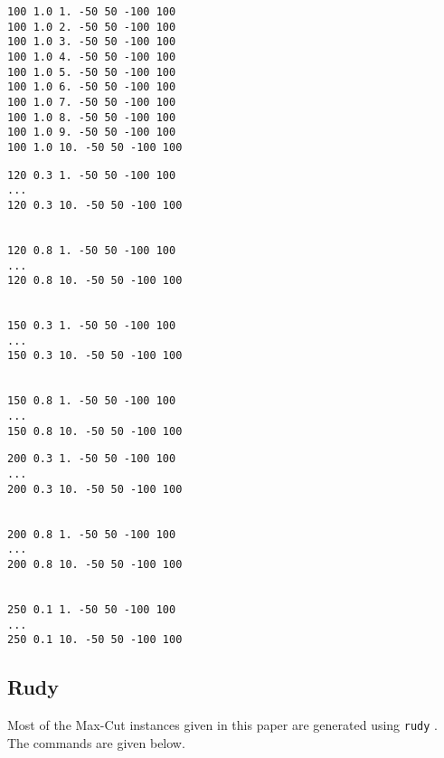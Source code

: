 \documentclass[a4paper, 12pt]{article}
\begin{document}
\begin{minipage}[t]{4cm}
\begin{tiny}
\begin{verbatim}   
100 1.0 1. -50 50 -100 100
100 1.0 2. -50 50 -100 100
100 1.0 3. -50 50 -100 100
100 1.0 4. -50 50 -100 100
100 1.0 5. -50 50 -100 100
100 1.0 6. -50 50 -100 100
100 1.0 7. -50 50 -100 100
100 1.0 8. -50 50 -100 100
100 1.0 9. -50 50 -100 100
100 1.0 10. -50 50 -100 100
\end{verbatim}
\end{tiny}
\end{minipage}
\hfill
\begin{minipage}[t]{4cm}
\begin{tiny}
\begin{verbatim}   
120 0.3 1. -50 50 -100 100
...
120 0.3 10. -50 50 -100 100


120 0.8 1. -50 50 -100 100
...
120 0.8 10. -50 50 -100 100


150 0.3 1. -50 50 -100 100
...
150 0.3 10. -50 50 -100 100


150 0.8 1. -50 50 -100 100
...
150 0.8 10. -50 50 -100 100
\end{verbatim}
\end{tiny}
\end{minipage}
\hfill
\begin{minipage}[t]{4cm}
\begin{tiny}
\begin{verbatim}   
200 0.3 1. -50 50 -100 100
...
200 0.3 10. -50 50 -100 100


200 0.8 1. -50 50 -100 100
...
200 0.8 10. -50 50 -100 100


250 0.1 1. -50 50 -100 100
...
250 0.1 10. -50 50 -100 100
\end{verbatim}
\end{tiny}
\end{minipage}

























\subsection{Rudy} \label{sec:rudy}
Most of the Max-Cut instances given in this paper are generated using {\tt rudy}
\cite{Ri}. The commands are given below.
\end{document}
